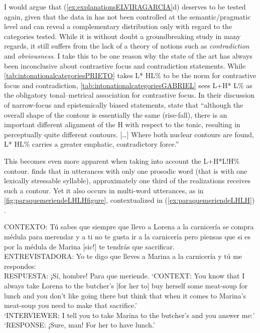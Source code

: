 I would argue that (\ref{ex:explanationsELVIRAGARCIA}d) deserves to be tested again, given that the data in \citet{ElviraGarcia.2016} has not been controlled at the semantic/pragmatic level and can reveal a complementary distribution only with regard to the categories tested. While it is without doubt a groundbreaking study in many regards, it still suffers from the lack of a theory of notions such as \textit{contradiction} and \textit{obviousness}. I take this to be one reason why the state of the art has always been inconclusive about contrastive focus and contradiction statements. While \autoref{tab:intonationalcategoriesPRIETO} takes L* HL\% to be the norm for contrastive focus and contradiction, \autoref{tab:intonationalcategoriesGABRIEL} sees L+H* L\% as the obligatory tonal--metrical association for contrastive focus. In their discussion of narrow-focus and epistemically biased statements, \citet[369]{HualdePrieto2015} state that ``although the overall shape of the contour is essentially the same (rise-fall), there is an important different alignment of the H with respect to the tonic, resulting in perceptually quite different contours. [\ldots] Where both nuclear contours are found, L* HL\% carries a greater emphatic, contradictory force.''

This becomes even more apparent when taking into account the L+H*L!H\% contour. \citet[258--260]{ElviraGarcia.2016} finds that in utterances with only one prosodic word (that is with one lexically stressable syllable), approximately one third of the realizations receives such a contour. Yet it also occurs in multi-word utterances, as in \autoref{fig:paraquemeriendeLHLHfigure}, contextualized in (\ref{ex:paraquemeriendeLHLH}) \citep[325--326]{ElviraGarcia.2016}.

\begin{exe}
	\ex  \label{ex:paraquemeriendeLHLH}  CONTEXTO: Tú sabes que siempre que llevo a Lorena a la carnicería se compra médula para merendar y a ti no te gusta ir a la carnicería pero piensas que si es por la médula de Marina [sic!] te tendrás que sacrificar.\\
	ENTREVISTADORA: Yo te digo que lleves a Marina a la carnicería y tú me respondes:\\
	RESPUESTA: ¡Sí, hombre! Para que meriende.
	\glt `CONTEXT: You know that I always take Lorena to the butcher's [for her to] buy herself some meat-soup for lunch and you don't like going there but think that when it comes to Marina's meat-soup you need to make that sacrifice.'\\
	`INTERVIEWER: I tell you to take Marina to the butcher's and you answer me:'\\
	`RESPONSE:	¡Sure, man! For her to have lunch.'
\end{exe}


